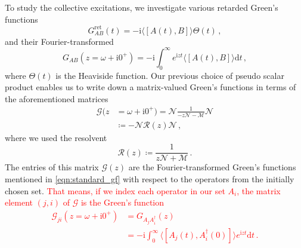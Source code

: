 \documentclass[
    reprint, 
    aps,
    preprintnumbers,
    twocolumn,
    prb,
    superscriptaddress
]{revtex4-2}
\newcommand{\im}{\mathrm{i}}
\newcommand{\mM}{\mathcal{M}}
\newcommand{\mN}{\mathcal{N}}
\newcommand{\markEdited}{red}
\begin{document}
To study the collective excitations, we investigate various retarded Green's functions 
\begin{equation}
    G_{AB}^\text{ret} (t) = - \im \langle [A(t), B] \rangle \Theta(t)\,,
\end{equation}
and their Fourier-transformed
\begin{equation}
    \label{eqn:standard_gf}
    G_{AB}(z = \omega + \im 0^+) = -\im \int_0^{\infty} e^{\im z t} \langle [A(t), B] \rangle \mathrm{d}t\,,
\end{equation}
where $\Theta(t)$ is the Heaviside function.
Our previous choice of pseudo scalar product enables us to write down a matrix-valued Green's functions in terms of the aforementioned matrices
\begin{align}
    \label{eqn:green_function}
    \mathcal{G}(z &= \omega + \im 0^+) = \mN \frac{1}{-z \mN - \mM} \mN \\
        &\coloneqq  -\mN \mathcal{R}(z) \mN\,,
\end{align}
where we used the resolvent
\begin{equation}
    \label{eqn:resolvent}
    \mathcal{R}(z) \coloneqq  \frac{1}{z \mN + \mM}\,.
\end{equation}
The entries of this matrix $\mathcal{G}(z)$ are the Fourier-transformed Green's functions mentioned in \eqref{eqn:standard_gf} with respect to the operators from the initially chosen set.
\textcolor{\markEdited}{That means, if we index each operator in our set $A_i$, the matrix element $(j,i)$ of $\mathcal{G}$ is the Green's function
\begin{align}
    \mathcal{G}_{ji}(z = \omega +\im 0^+) &=  G_{A_j A_i^\dagger} (z) \nonumber \\
        &= -\im \int_0^{\infty} \langle [A_j(t), A_i^\dagger(0)] \rangle e^{\im z t} \mathrm{d}t\,.
\end{align}}
\end{document}
